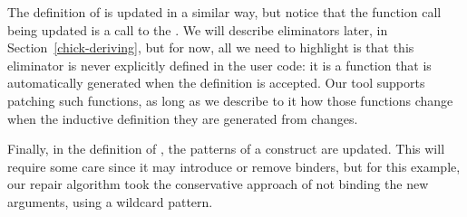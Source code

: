 The definition of  is updated in a similar way, but notice
that the function call being updated is a call to the 
.  We will describe eliminators later, in
Section~\ref{chick-deriving}, but for now, all we need to highlight is that this
eliminator is never explicitly defined in the user code: it is a function that
is automatically generated when the  definition is accepted.  Our
tool supports patching such functions, as long as we describe to it how those
functions change when the inductive definition they are generated from changes.

Finally, in the definition of , the patterns of a
 construct are updated.  This will require some care since it
may introduce or remove binders, but for this example, our repair algorithm took
the conservative approach of not binding the new arguments, using a wildcard
\coqinline{_} pattern.
